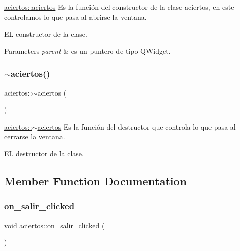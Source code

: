 \hyperlink{classaciertos_a46e28661870e72ccb00b558478420f64}{aciertos\+::aciertos} Es la función del constructor de la clase aciertos, en este controlamos lo que pasa al abrirse la ventana. 

EL constructor de la clase.


\begin{DoxyParams}{Parameters}
{\em parent} & es un puntero de tipo Q\+Widget. \\
\hline
\end{DoxyParams}
\mbox{\label{classaciertos_aef1c2b79f77ef192dd48a2359c78b83d}} 
\subsubsection{\texorpdfstring{$\sim$aciertos()}{~aciertos()}}
{\footnotesize\ttfamily aciertos\+::$\sim$aciertos (\begin{DoxyParamCaption}{ }\end{DoxyParamCaption})}



\hyperlink{classaciertos_aef1c2b79f77ef192dd48a2359c78b83d}{aciertos\+::$\sim$aciertos} Es la función del destructor que controla lo que pasa al cerrarse la ventana. 

EL destructor de la clase. 

\subsection{Member Function Documentation}
\mbox{\label{classaciertos_a1b36eb2a2c3fef95390943d8dacf915d}} 
\subsubsection{\texorpdfstring{on\+\_\+salir\+\_\+clicked}{on\_salir\_clicked}}
{\footnotesize\ttfamily void aciertos\+::on\+\_\+salir\+\_\+clicked (\begin{DoxyParamCaption}{ }\end{DoxyParamCaption})\hspace{0.3cm}{\ttfamily [slot]}}



